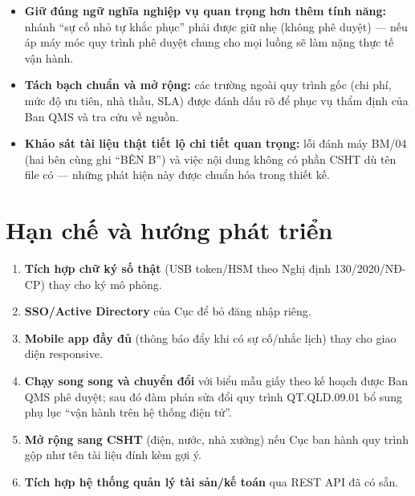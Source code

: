 \begin{itemize}
  \item \textbf{Giữ đúng ngữ nghĩa nghiệp vụ quan trọng hơn thêm tính năng:} nhánh ``sự cố nhỏ tự khắc phục'' phải được giữ nhẹ (không phê duyệt) — nếu áp máy móc quy trình phê duyệt chung cho mọi luồng sẽ làm nặng thực tế vận hành.
  \item \textbf{Tách bạch chuẩn và mở rộng:} các trường ngoài quy trình gốc (chi phí, mức độ ưu tiên, nhà thầu, SLA) được đánh dấu rõ để phục vụ thẩm định của Ban QMS và tra cứu về nguồn.
  \item \textbf{Khảo sát tài liệu thật tiết lộ chi tiết quan trọng:} lỗi đánh máy BM/04 (hai bên cùng ghi ``BÊN B'') và việc nội dung không có phần CSHT dù tên file có — những phát hiện này được chuẩn hóa trong thiết kế.
\end{itemize}

\section{Hạn chế và hướng phát triển}

\begin{enumerate}
  \item \textbf{Tích hợp chữ ký số thật} (USB token/HSM theo Nghị định 130/2020/NĐ-CP) thay cho ký mô phỏng.
  \item \textbf{SSO/Active Directory} của Cục để bỏ đăng nhập riêng.
  \item \textbf{Mobile app đầy đủ} (thông báo đẩy khi có sự cố/nhắc lịch) thay cho giao diện responsive.
  \item \textbf{Chạy song song và chuyển đổi} với biểu mẫu giấy theo kế hoạch được Ban QMS phê duyệt; sau đó đàm phán sửa đổi quy trình QT.QLD.09.01 bổ sung phụ lục ``vận hành trên hệ thống điện tử''.
  \item \textbf{Mở rộng sang CSHT} (điện, nước, nhà xưởng) nếu Cục ban hành quy trình gộp như tên tài liệu đính kèm gợi ý.
  \item \textbf{Tích hợp hệ thống quản lý tài sản/kế toán} qua REST API đã có sẵn.
\end{enumerate}
